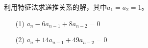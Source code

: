 利用特征法求递推关系的解，其中$a_1=a_2=1$。
\begin{enumerate}
    \item[(1)] $a_n-6a_{n-1}+8a_{n-2}=0$
    \item[(2)] $a_n+14a_{n-1}+49a_{n-2}=0$
\end{enumerate}